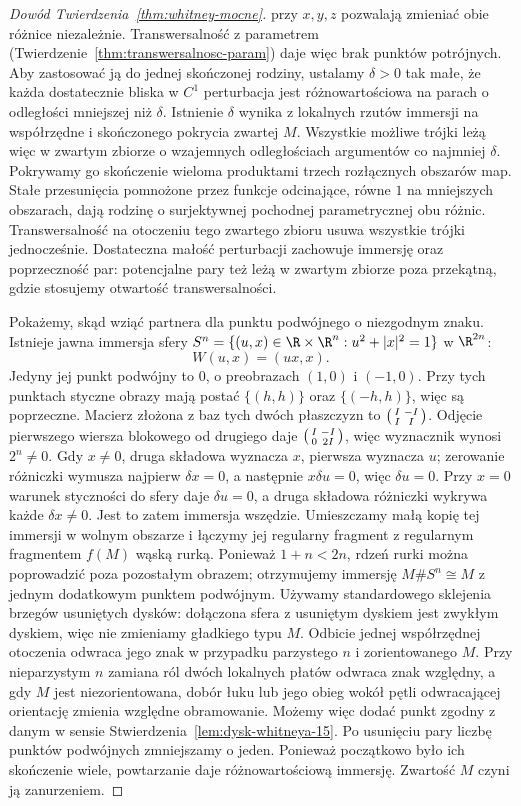\begin{proof}[Dowód Twierdzenia~\ref{thm:whitney-mocne}]
przy $x,y,z$ pozwalają zmieniać
obie różnice niezależnie.
Transwersalność z parametrem
(Twierdzenie~\ref{thm:transwersalnosc-param})
daje więc brak punktów potrójnych. Aby zastosować
ją do jednej skończonej rodziny, ustalamy
$\delta>0$ tak małe, że każda dostatecznie bliska
w $C^1$ perturbacja jest różnowartościowa na parach
o odległości mniejszej niż $\delta$. Istnienie
$\delta$ wynika z lokalnych rzutów immersji na
współrzędne i skończonego pokrycia zwartej $M$.
Wszystkie możliwe trójki leżą więc w zwartym zbiorze
o wzajemnych odległościach argumentów co najmniej
$\delta$. Pokrywamy go skończenie wieloma produktami
trzech rozłącznych obszarów map. Stałe przesunięcia
pomnożone przez funkcje odcinające, równe $1$ na
mniejszych obszarach, dają rodzinę o surjektywnej
pochodnej parametrycznej obu różnic. Transwersalność
na otoczeniu tego zwartego zbioru usuwa wszystkie
trójki jednocześnie. Dostateczna małość perturbacji
zachowuje immersję oraz poprzeczność par: potencjalne
pary też leżą w zwartym zbiorze poza przekątną,
gdzie stosujemy otwartość transwersalności.

Pokażemy, skąd wziąć partnera dla
punktu podwójnego o niezgodnym znaku.
Istnieje jawna immersja sfery
$S^n=\{(u,x)\in\R\times\R^n:
u^2+|x|^2=1\}$ w $\R^{2n}$:
\[
 W(u,x)=(ux,x).
\]
Jedyny jej punkt podwójny to $0$,
o preobrazach $(1,0)$ i $(-1,0)$.
Przy tych punktach styczne obrazy
mają postać $\{(h,h)\}$ oraz
$\{(-h,h)\}$, więc są poprzeczne.
Macierz złożona z baz tych dwóch płaszczyzn to
$\begin{psmallmatrix}I&-I\\I&I\end{psmallmatrix}$.
Odjęcie pierwszego wiersza blokowego od drugiego
daje $\begin{psmallmatrix}I&-I\\0&2I\end{psmallmatrix}$,
więc wyznacznik wynosi $2^n\ne0$.
Gdy $x\ne0$, druga składowa
wyznacza $x$, pierwsza wyznacza $u$;
zerowanie różniczki wymusza najpierw $\delta x=0$,
a następnie $x\delta u=0$, więc $\delta u=0$.
Przy $x=0$ warunek styczności do sfery daje
$\delta u=0$, a druga składowa różniczki wykrywa
każde $\delta x\ne0$. Jest to zatem immersja wszędzie. Umieszczamy małą
kopię tej immersji w wolnym
obszarze i łączymy jej regularny
fragment z regularnym fragmentem
$f(M)$ wąską rurką. Ponieważ
$1+n<2n$, rdzeń rurki można
poprowadzić poza pozostałym
obrazem; otrzymujemy immersję
$M\#S^n\cong M$ z jednym
dodatkowym punktem podwójnym. Używamy standardowego
sklejenia brzegów usuniętych dysków: dołączona
sfera z usuniętym dyskiem jest zwykłym dyskiem,
więc nie zmieniamy gładkiego typu $M$.
Odbicie jednej współrzędnej
otoczenia odwraca jego znak
w przypadku parzystego
$n$ i zorientowanego $M$.
Przy nieparzystym $n$ zamiana
ról dwóch lokalnych płatów
odwraca znak względny,
a gdy $M$ jest niezorientowana,
dobór łuku lub jego obieg wokół
pętli odwracającej orientację
zmienia względne obramowanie.
Możemy więc dodać punkt
zgodny z danym w sensie
Stwierdzenia~\ref{lem:dysk-whitneya-15}.
Po usunięciu pary liczbę
punktów podwójnych zmniejszamy
o jeden. Ponieważ początkowo
było ich skończenie wiele,
powtarzanie daje różnowartościową
immersję. Zwartość $M$ czyni
ją zanurzeniem.


\end{proof}
